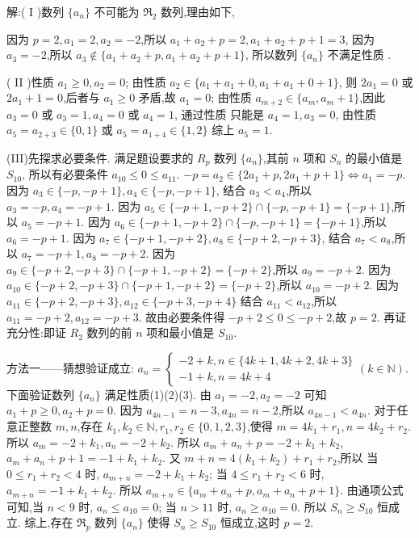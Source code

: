 \begin{solutions}
解:( I )数列 $\{a_n\}$ 不可能为 $\mathfrak{R}_2$ 数列,理由如下,

因为 $p=2, a_1=2, a_2=-2$,所以 $a_1+a_2+p=2, a_1+a_2+p+1=3$,
因为 $a_3=-2$,所以 $a_3 \notin \{a_1+a_2+p, a_1+a_2+p+1\}$,
所以数列 $\{a_n\}$ 不满足性质 .

( II )性质 $ a_1 \geqslant 0, a_2=0$;
由性质 $ a_2 \in \{a_1+a_1+0, a_1+a_1+0+1\}$,
则 $2a_1=0$ 或 $2a_1+1=0$,后者与 $a_1 \geqslant 0$ 矛盾,故 $a_1=0$;
由性质 $ a_{m+2} \in \{a_m, a_m+1\}$,因此 $a_3=0$ 或 $a_3=1, a_4=0$ 或 $a_4=1$,
通过性质  只能是 $a_4=1, a_3=0$,
由性质 $ a_5=a_{2+3} \in \{0,1\}$ 或 $a_5=a_{1+4} \in \{1,2\}$
综上 $a_5=1$.

(III)先探求必要条件. 满足题设要求的 $R_p$ 数列 $\{a_n\}$,其前 $n$ 项和 $S_n$ 的最小值是 $S_{10}$,
所以有必要条件 $a_{10} \leqslant 0 \leqslant a_{11}$.
$-p=a_2 \in \{2a_1+p, 2a_1+p+1\} \Leftrightarrow a_1=-p$.
因为 $a_3 \in \{-p, -p+1\}, a_4 \in \{-p, -p+1\}$,
结合 $a_3 < a_4$,所以 $a_3=-p, a_4=-p+1$.
因为 $a_5 \in \{-p+1, -p+2\} \cap \{-p, -p+1\} = \{-p+1\}$,所以 $a_5=-p+1$.
因为 $a_6 \in \{-p+1, -p+2\} \cap \{-p, -p+1\} = \{-p+1\}$,所以 $a_6=-p+1$.
因为 $a_7 \in \{-p+1, -p+2\}, a_8 \in \{-p+2, -p+3\}$,
结合 $a_7 < a_8$,所以 $a_7=-p+1, a_8=-p+2$.
因为 $a_9 \in \{-p+2, -p+3\} \cap \{-p+1, -p+2\} = \{-p+2\}$,所以 $a_9=-p+2$.
因为 $a_{10} \in \{-p+2, -p+3\} \cap \{-p+1, -p+2\} = \{-p+2\}$,所以 $a_{10}=-p+2$.
因为 $a_{11} \in \{-p+2, -p+3\}, a_{12} \in \{-p+3, -p+4\}$
结合 $a_{11} < a_{12}$,所以 $a_{11}=-p+2, a_{12}=-p+3$.
故由必要条件得 $-p+2 \leqslant 0 \leqslant -p+2$,故 $p=2$.
再证充分性:即证 $R_2$ 数列的前 $n$ 项和最小值是 $S_{10}$.

方法一——猜想验证成立:
$a_n=\begin{cases} -2+k, n \in \{4k+1, 4k+2, 4k+3\} \\ -1+k, n=4k+4 \end{cases} (k \in \mathbb{N})$.
下面验证数列 $\{a_n\}$ 满足性质(1)(2)(3).
由 $a_1=-2, a_2=-2$ 可知 $a_1+p \geqslant 0, a_2+p=0$.
因为 $a_{4n-1}=n-3, a_{4n}=n-2$,所以 $a_{4n-1} < a_{4n}$.
对于任意正整数 $m,n$,存在 $k_1, k_2 \in \mathbb{N}, r_1, r_2 \in \{0,1,2,3\}$,使得 $m=4k_1+r_1, n=4k_2+r_2$.
所以 $a_m=-2+k_1, a_n=-2+k_2$.
所以 $a_m+a_n+p=-2+k_1+k_2$,
$a_m+a_n+p+1=-1+k_1+k_2$.
又 $m+n=4(k_1+k_2)+r_1+r_2$,所以
当 $0 \leqslant r_1+r_2 < 4$ 时, $a_{m+n}=-2+k_1+k_2$;
当 $4 \leqslant r_1+r_2 < 6$ 时, $a_{m+n}=-1+k_1+k_2$.
所以 $a_{m+n} \in \{a_m+a_n+p, a_m+a_n+p+1\}$.
由通项公式可知,当 $n < 9$ 时, $a_n \leqslant a_{10}=0$;
当 $n > 11$ 时, $a_n \geqslant a_{10}=0$.
所以 $S_n \geqslant S_{10}$ 恒成立.
综上,存在 $\mathfrak{R}_p$ 数列 $\{a_n\}$ 使得 $S_n \geqslant S_{10}$ 恒成立,这时 $p=2$.


\end{solutions}
